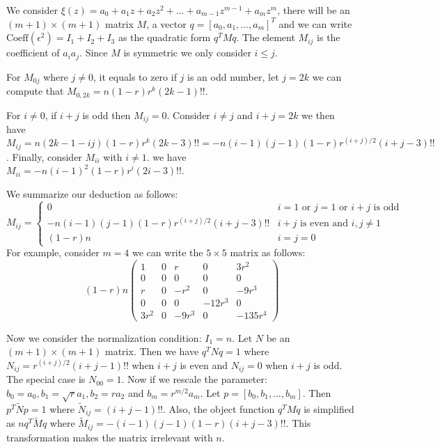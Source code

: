 \documentclass{article}
\begin{document}
We consider $\xi(z) = a_0 + a_1 z + a_2 z^2 + \dots + a_{m-1} z^{m-1} + a_m z^m $, there will be an $(m+1) \times (m+1) $ matrix $M$, a vector  $q = [a_0, a_1, \dots, a_m]^T$ and  we can write $\textrm{Coeff}(\epsilon^2) = I_1 + I_2 + I_3$ as the quadratic form $ q^T M q $. The element $M_{ij}$ is the coefficient of $a_ia_j$. Since $M$ is symmetric we only consider $i\leq j$.

For $M_{0j}$ where $j \neq 0$, it equals to zero if $j$ is an odd number, let $j=2k$ we can compute that $M_{0,2k}=n (1-r)r^k (2k-1)!! $. 

For $i \neq 0$, if $i+j$ is odd then $M_{ij} = 0$. Consider $i \neq j$ and $i+j = 2k$ we then have $M_{ij} = n(2k-1-ij) (1-r)r^k (2k-3)!! = -n(i-1)(j-1) (1-r)r^{(i+j)/ 2 } (i+j-3)!!$. Finally, consider $M_{ii}$ with $i \neq 1$. we have $M_{ii} = 
-n(i-1)^2 (1-r)r^i (2i-3)!!$.

We summarize our deduction as follows:
\begin{equation}
M_{ij} = \begin{cases} 0 & i=1 \textrm{ or } j=1 \textrm{ or } i + j \textrm{ is odd} \\
 -n(i-1)(j-1) (1-r)r^{(i+j)/ 2 } (i+j-3)!! & i+j \textrm{ is even and } i,j \neq 1 \\
(1-r)n & i=j=0
\end{cases}
\end{equation}
For example, consider $m = 4$ we can write the $ 5 \times 5 $ matrix as follows:
$$
(1-r)n\begin{pmatrix}
1 & 0 & r  & 0 & 3r^2\\
0 & 0 & 0  & 0 & 0\\
r &  0 & - r^2 & 0 & -9 r^3 \\
0 & 0 & 0 & -12r^3 & 0 \\
3r^2 & 0 & -9 r^3 & 0 & -135r^4 
\end{pmatrix}
$$

Now we consider the normalization condition: $I_1 = n$. Let $N$ be an $(m+1) \times (m+1)$ matrix.
Then we have $q^T N q = 1$ where $N_{ij} =r^{(i+j) / 2} (i+j -1)!!$ when $i+j$ is even and $N_{ij} = 0$ when $i+j$ is odd. The special case is $N_{00} = 1$. Now if we rescale the parameter: $b_0 =  a_0, b_1 = \sqrt{r} a_1, b_2 = r a_2$ and $b_m = r^{m/2} a_m$. Let $p = [b_0, b_1, \dots, b_m]$. Then $p^T \widetilde{N} p =1$ where $\widetilde{N}_{ij} =  (i+j -1)!!$. Also, the object function $q^T M q$ is simplified as $nq^T \widetilde{M} q$ where $\widetilde{M}_{ij} =  -(i-1)(j-1)(1-r) (i+j-3)!! $. This transformation makes the matrix irrelevant with $n$.
\end{document}
